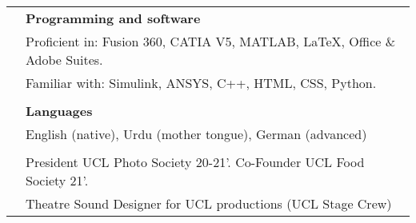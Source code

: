 \documentclass[letterpaper, 11pt]{article}
\begin{document}
\begin{longtable}{p{1.3in}p{4.8in}}

{\color{OliveGreen}{Skills}} 
& \textbf{Programming and software}\\
& Proficient in: Fusion 360, CATIA V5, MATLAB, \LaTeX, Office \& Adobe Suites. \\
& Familiar with: Simulink, ANSYS, C++, HTML, CSS, Python. \\
& \\

& \textbf{Languages} \\
& English (native), Urdu (mother tongue), German (advanced) \\
& \\




\nohyphens{\color{OliveGreen}{Other interests}} 
& President UCL Photo Society 20-21'. Co-Founder UCL Food Society 21'.\\ 
& Theatre Sound Designer for UCL productions (UCL Stage Crew)\\


\end{longtable}
\end{document}
